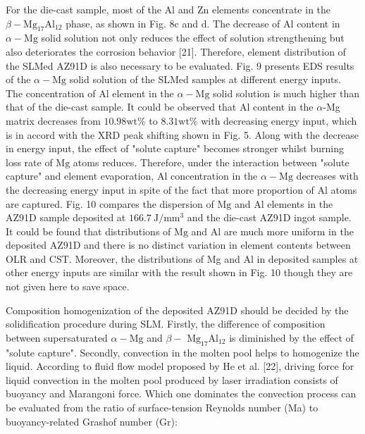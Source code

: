 \documentclass[10pt]{article}
\begin{document}
For the die-cast sample, most of the $\mathrm{Al}$ and $\mathrm{Zn}$ elements concentrate in the $\beta-\mathrm{Mg}_{17} \mathrm{Al}_{12}$ phase, as shown in Fig. $8 \mathrm{c}$ and $\mathrm{d}$. The decrease of $\mathrm{Al}$ content in $\alpha-\mathrm{Mg}$ solid solution not only reduces the effect of solution strengthening but also deteriorates the corrosion behavior [21]. Therefore, element distribution of the SLMed AZ91D is also necessary to be evaluated. Fig. 9 presents EDS results of the $\alpha-\mathrm{Mg}$ solid solution of the SLMed samples at different energy inputs. The concentration of $\mathrm{Al}$ element in the $\alpha-\mathrm{Mg}$ solid solution is much higher than that of the die-cast sample. It could be observed that $\mathrm{Al}$ content in the $\alpha$-Mg matrix decreases from $10.98 \mathrm{wt} \%$ to $8.31 \mathrm{wt} \%$ with decreasing energy input, which is in accord with the XRD peak shifting shown in Fig. 5. Along with the decrease in energy input, the effect of "solute capture" becomes stronger whilst burning loss rate of $\mathrm{Mg}$ atoms reduces. Therefore, under the interaction between "solute capture" and element evaporation, $\mathrm{Al}$ concentration in the $\alpha-\mathrm{Mg}$ decreases with the decreasing energy input in spite of the fact that more proportion of $\mathrm{Al}$ atoms are captured. Fig. 10 compares the dispersion of $\mathrm{Mg}$ and $\mathrm{Al}$ elements in the AZ91D sample deposited at $166.7 \mathrm{~J} / \mathrm{mm}^{3}$ and the die-cast AZ91D ingot sample. It could be found that distributions of $\mathrm{Mg}$ and $\mathrm{Al}$ are much more uniform in the deposited AZ91D and there is no distinct variation in element contents between OLR and CST. Moreover, the distributions of Mg and $\mathrm{Al}$ in deposited samples at other energy inputs are similar with the result shown in Fig. 10 though they are not given here to save space.

Composition homogenization of the deposited AZ91D should be decided by the solidification procedure during SLM. Firstly, the difference of composition between supersaturated $\alpha-\mathrm{Mg}$ and $\beta-$ $\mathrm{Mg}_{17} \mathrm{Al}_{12}$ is diminished by the effect of "solute capture". Secondly, convection in the molten pool helps to homogenize the liquid. According to fluid flow model proposed by He et al. [22], driving force for liquid convection in the molten pool produced by laser irradiation consists of buoyancy and Marangoni force. Which one dominates the convection process can be evaluated from the ratio of surface-tension Reynolds number (Ma) to buoyancy-related Grashof number (Gr):
\end{document}
